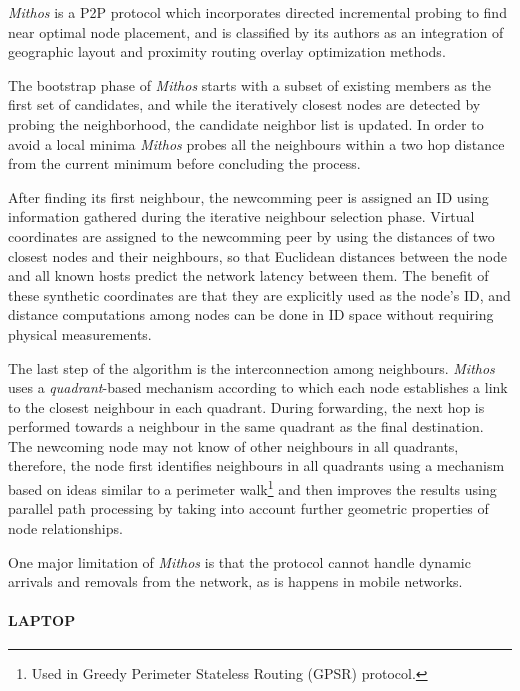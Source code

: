 \documentclass[acmcsur,acmnow]{acmtrans2m}
\begin{document}
\textit{Mithos} \cite{waldvogel_mythos_2003} is a P2P protocol which
incorporates directed incremental probing to find near optimal node placement,
and is classified by its authors as an integration of geographic layout
and proximity routing overlay optimization methods.

The bootstrap phase of \textit{Mithos} starts with a subset of existing members
as the first set of candidates, and while the iteratively closest nodes are
detected by probing the neighborhood, the candidate neighbor list is updated. In
order to avoid a local minima \textit{Mithos} probes all the neighbours within a
two hop distance from the current minimum before concluding the process.

After finding its first neighbour, the newcomming peer is assigned an ID using
information gathered during the iterative neighbour selection phase. Virtual
coordinates are assigned to the newcomming peer by using the distances of two
closest nodes and their neighbours, so that Euclidean distances between the node
and all known hosts predict the network latency between
them\cite{cox_vivaldi_2004}.  The benefit of these synthetic coordinates are
that they are explicitly used as the node's ID, and distance computations among
nodes can be done in ID space without requiring physical measurements.

The last step of the algorithm is the interconnection among neighbours.
\emph{Mithos} uses a \emph{quadrant}-based mechanism according to which each
node establishes a link to the closest neighbour in each quadrant. During
forwarding, the next hop is performed towards a neighbour in the same quadrant
as the final destination. The newcoming node may not know of other neighbours
in all quadrants, therefore, the node first identifies neighbours in all
quadrants using a mechanism based on ideas similar to a perimeter
walk\footnote{Used in Greedy Perimeter Stateless Routing (GPSR) protocol.} and
then improves the results using parallel path processing by taking into account
further geometric properties of node relationships.

One major limitation of \textit{Mithos} is that the protocol cannot handle
dynamic arrivals and removals from the network, as is happens in mobile
networks.

\paragraph*{\bf LAPTOP}
\end{document}
